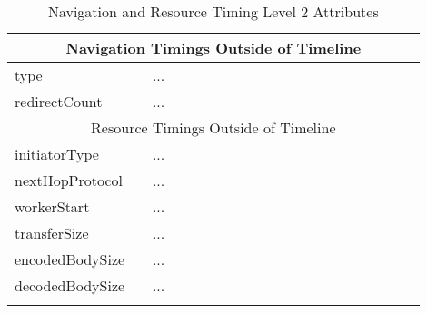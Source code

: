 \begin{center}
\begin{longtable}{ | p{0.3\linewidth} | p{0.6\linewidth} | }
	\hline
	\multicolumn{2}{|c|}{Navigation Timings Outside of Timeline} \\
	\hline
	type & ... \\
	\hline
	redirectCount & ... \\

	\hline
	\multicolumn{2}{|c|}{Resource Timings Outside of Timeline} \\
	\hline
	initiatorType & ... \\
	\hline
	nextHopProtocol & ... \\
	\hline
	workerStart & ... \\
	\hline
	transferSize & ... \\
	\hline
	encodedBodySize & ... \\
	\hline
	decodedBodySize & ... \\
	\hline
	
	\caption{Navigation and Resource Timing Level 2 Attributes} %
	\label{tab:navigationtiming}
	\end{longtable}
\end{center}

















